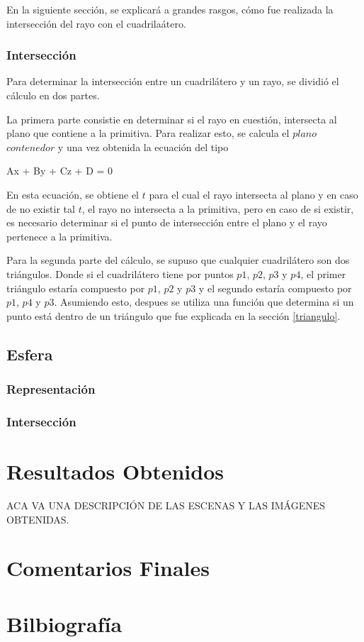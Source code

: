 \documentclass[a4paper,10pt]{article}
\begin{document}
En la siguiente secci\'on, se explicar\'a a grandes rasgos, c\'omo fue realizada la intersecci\'on del rayo con el cuadrila\'atero.
\subsubsection{Intersecci\'on}
Para determinar la intersecci\'on entre un cuadril\'atero y un rayo, se dividi\'o el c\'alculo en dos partes.

La primera parte consistie en determinar si el rayo en cuesti\'on, intersecta al plano que contiene a la primitiva.  Para realizar esto, se calcula el $plano$ $contenedor$ y una vez obtenida la ecuaci\'on del tipo

 \begin{center}
 Ax + By + Cz + D = 0
\end{center}

En esta ecuaci\'on, se obtiene el $t$ para el cual el rayo intersecta al plano y en caso de no existir tal $t$, el rayo no intersecta a la primitiva, pero en caso de si existir, es necesario determinar si el punto de intersecci\'on entre el plano y el rayo pertenece a la primitiva.

Para la segunda parte del c\'alculo, se supuso que cualquier cuadril\'atero son dos tri\'angulos.  Donde si el cuadril\'atero tiene por puntos $p1$, $p2$, $p3$ y $p4$, el primer tri\'angulo estar\'ia compuesto por $p1$, $p2$ y $p3$ y el segundo estar\'ia compuesto por $p1$, $p4$ y $p3$.
Asumiendo esto, despues se utiliza una funci\'on que determina si un punto est\'a dentro de un tri\'angulo que fue explicada en la secci\'on \ref{triangulo}.

\subsection{Esfera}

\subsubsection{Representaci\'on}

\subsubsection{Intersecci\'on}

\section{Resultados Obtenidos}

ACA VA UNA DESCRIPCI\'ON DE LAS ESCENAS Y LAS IM\'AGENES OBTENIDAS.

\section{Comentarios Finales}

\section{Bilbiograf\'ia}
\end{document}
